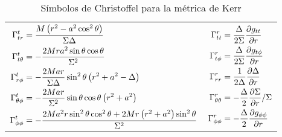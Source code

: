 \begin{table}
    \begin{small}
        \caption{Símbolos de Christoffel para la métrica de Kerr}
        \label{tab:christoffel_kerr}
        \begin{center}
            \begin{tabular}[c]{l|l}
                \hline
                $\begin{aligned}
                         \Gamma_{t r}^t         & =\frac{M\left(r^2-a^2 \cos ^2 \theta\right)}{\Sigma \Delta}                                         \\
                         \Gamma_{t \theta}^t    & =-\frac{2 M r a^2 \sin \theta \cos \theta}{\Sigma^2}                                                \\
                         \Gamma_{r \phi}^t      & =-\frac{2 M a r}{\Sigma \Delta} \sin ^2 \theta\left(r^2+a^2-\Delta\right)                           \\
                         \Gamma_{\theta \phi}^t & =-\frac{2 M a r}{\Sigma^2} \sin \theta \cos \theta\left(r^2+a^2\right)                              \\
                         \Gamma_{\phi \phi}^t   & =-\frac{2 M a^2 r \sin ^2 \theta \cos ^2 \theta+2 M r\left(r^2+a^2\right) \sin ^2 \theta}{\Sigma^2}
                     \end{aligned}$
                                                                                                                                                                                                                                                                                                                                                                                                                                                                                                                                                                                & $\begin{aligned} \Gamma_{t t}^r & =\frac{\Delta}{2 \Sigma} \frac{\partial g_{t t}}{\partial r} \\ \Gamma_{t \phi}^r & =\frac{\Delta}{2 \Sigma} \frac{\partial g_{t \phi}}{\partial r} \\ \Gamma_{r r}^r & =\frac{1}{2 \Delta} \frac{\partial \Delta}{\partial r} \\ \Gamma_{\theta \theta}^r & =-\frac{\Delta}{2} \frac{\partial \Sigma}{\partial r} / \Sigma \\ \Gamma_{\phi \phi}^r & =-\frac{\Delta}{2} \frac{\partial g_{\phi \phi}}{\partial r}\end{aligned}$ \\

\end{tabular}
\end{center}
\end{small}
\end{table}
